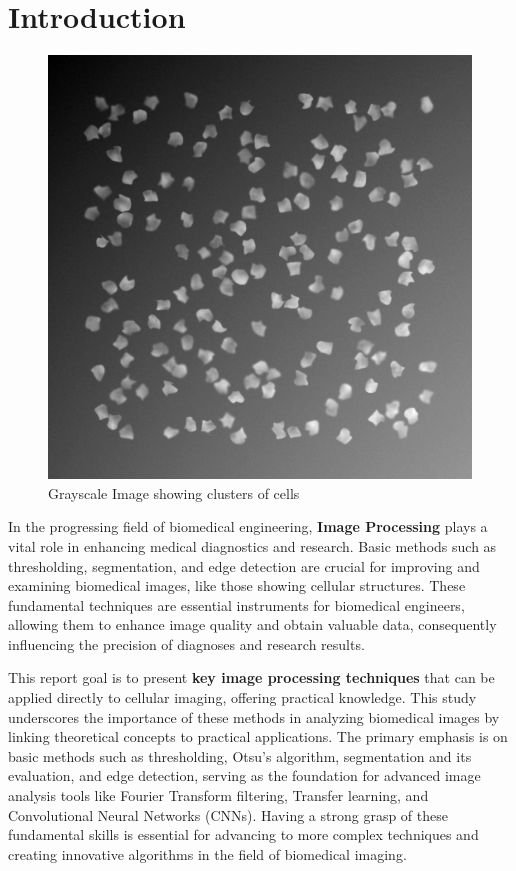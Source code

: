 \documentclass[%
	a4paper, %
	12pt, %
	english, %
	bibtotoc %
]{scrartcl}
\begin{document}


\tableofcontents
\newpage

\section{Introduction}%
\label{sec:introduction}

\begin{figure}
    \centering
    \includegraphics[width=0.3\linewidth]{cells.png}
    \caption{Grayscale Image showing clusters of cells}
    \label{fig:figurecell}
\end{figure}


In the progressing field of biomedical engineering, \textbf{Image Processing} plays a vital role in enhancing medical diagnostics and research. Basic methods such as thresholding, segmentation, and edge detection are crucial for improving and examining biomedical images, like those showing cellular structures. These fundamental techniques are essential instruments for biomedical engineers, allowing them to enhance image quality and obtain valuable data, consequently influencing the precision of diagnoses and research results.

This report goal is to present \textbf{key image processing techniques} that can be applied directly to cellular imaging, offering practical knowledge. This study underscores the importance of these methods in analyzing biomedical images by linking theoretical concepts to practical applications. The primary emphasis is on basic methods such as thresholding, Otsu's algorithm, segmentation and its evaluation, and edge detection, serving as the foundation for advanced image analysis tools like Fourier Transform filtering, Transfer learning, and Convolutional Neural Networks (CNNs). Having a strong grasp of these fundamental skills is essential for advancing to more complex techniques and creating innovative algorithms in the field of biomedical imaging.
\end{document}
